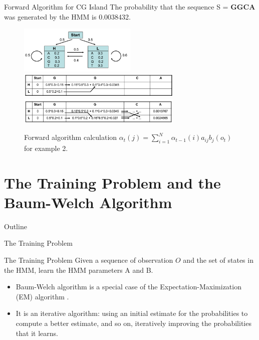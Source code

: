 \documentclass{beamer}
\begin{document}
\begin{frame}{Forward Algorithm for CG Island}
	The probability that the sequence S = \textbf{GGCA} was generated by the HMM is 0.0038432.
	\begin{figure}
		\centering
		\includegraphics[width = 0.5\textwidth]{example1.png}
		\includegraphics[width = 0.7\textwidth]{example2cal2.png}
		\includegraphics[width = 0.7\textwidth]{example2cal3.png}
		\caption{Forward algorithm calculation $\alpha_t(j) = \sum_{i=1}^N \alpha_{t-1}(i)a_{ij} b_j(o_t)$ for example 2.}
	\end{figure}
\end{frame}

\section{The Training Problem and the Baum-Welch Algorithm}
\begin{frame}{Outline}
	\tableofcontents[currentsection]
\end{frame}
\begin{frame}{The Training Problem }
	\begin{block}{The Training Problem}
		Given a sequence of observation $O$ and the set of states in the HMM, learn the HMM parameters A and B.
	\end{block}
	\begin{itemize}
		\item Baum-Welch algorithm is a special case of the Expectation-Maximization (EM) algorithm \cite{Jurafsky2009}.
		\item It is an iterative algorithm: using an initial estimate for the probabilities to compute a better estimate, and so on, iteratively improving the probabilities that it learns. 
	\end{itemize}
\end{frame}
\end{document}
